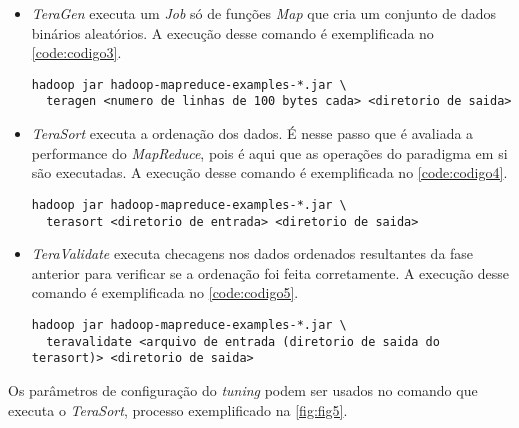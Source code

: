 \begin{itemize}
  \item \textit{TeraGen} executa um \textit{Job} só de funções \textit{Map} que cria um conjunto de dados binários aleatórios. A execução desse comando é exemplificada no \autoref{code:codigo3}.
  
  \begin{lstlisting}[caption={Exemplo de execução do \textit{TeraGen} adaptado de \cite{HadoopBook15}}, label=code:codigo3]
  hadoop jar hadoop-mapreduce-examples-*.jar \
  teragen <numero de linhas de 100 bytes cada> <diretorio de saida>
  \end{lstlisting}
  
  \item \textit{TeraSort} executa a ordenação dos dados. É nesse passo que é avaliada a performance do \textit{MapReduce}, pois é aqui que as operações do paradigma em si são executadas. A execução desse comando é exemplificada no \autoref{code:codigo4}.
  \begin{lstlisting}[caption={Exemplo de execução do \textit{TeraSort} adaptado de \cite{HadoopBook15}}, label=code:codigo4]
  hadoop jar hadoop-mapreduce-examples-*.jar \
  terasort <diretorio de entrada> <diretorio de saida>
  \end{lstlisting}  

  \item \textit{TeraValidate} executa checagens nos dados ordenados resultantes da fase anterior para verificar se a ordenação foi feita corretamente. A execução desse comando é exemplificada no \autoref{code:codigo5}.
  \begin{lstlisting}[caption={Exemplo de execução do \textit{TeraValidate} adaptado de \cite{HadoopBook15}}, label=code:codigo5]
  hadoop jar hadoop-mapreduce-examples-*.jar \
  teravalidate <arquivo de entrada (diretorio de saida do terasort)> <diretorio de saida>
  \end{lstlisting}

\end{itemize}

Os parâmetros de configuração do \textit{tuning} podem ser usados no comando que executa o \textit{TeraSort}, processo exemplificado na \autoref{fig:fig5}.


